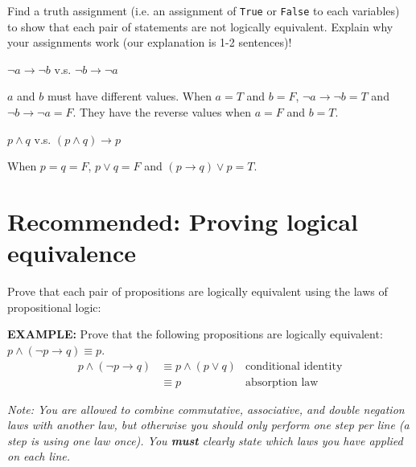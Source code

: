 \documentclass[homework, problems]{../../latex-common/cs151-common}
\begin{document}
Find a truth assignment (i.e. an assignment of \texttt{True} or \texttt{False} to each variables) to show that each pair of statements are not logically equivalent. Explain why your assignments work (our explanation is 1-2 sentences)!

\begin{enumeratequestions}
    \item $\neg a \rightarrow \neg b$ v.s. $\neg b \rightarrow \neg a$
    \begin{solution}
        $a$ and $b$ must have different values. When $a=T$ and $b=F$, $\neg a \rightarrow \neg b = T$ and $\neg b \rightarrow \neg a = F$. They have the reverse values when $a=F$ and $b=T$.
    \end{solution}
    
    \item $p \land q$ v.s. $(p \land q) \rightarrow p$
    \begin{solution}
        When $p=q=F$, $p \vee q = F$ and $(p \rightarrow q) \vee p =T$.
    \end{solution}
\end{enumeratequestions}

\section{Recommended: Proving logical equivalence}
Prove that each pair of propositions are logically equivalent using the laws of propositional logic:

\begin{example}
    \textbf{EXAMPLE:} Prove that the following propositions are logically equivalent: $p \wedge (\neg p \rightarrow q) \equiv p$.
    \begin{align*}
        p \wedge (\neg p \rightarrow q) & \equiv p \wedge (p \vee q) & \text{conditional identity} \\
        & \equiv p & \text{absorption law}
    \end{align*}
\end{example}

\begin{problemsonly}
\textit{Note: You are allowed to combine commutative, associative, and double negation laws with another law, but otherwise you should only perform one step per line (a step is using one law once). You \textbf{must} clearly state which laws you have applied on each line.}
\end{problemsonly}
\end{document}
